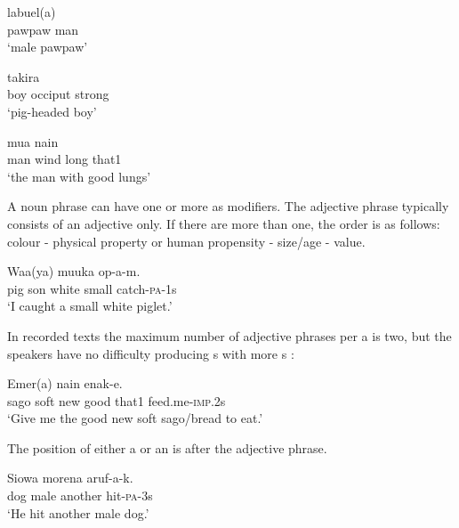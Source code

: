 \ea%
\label{ex:4:x416}
\gll labuel(a)   \\
     pawpaw  man \\
\glt`male pawpaw'
\z

\ea%
\label{ex:4:x417}
\gll takira     \\
  boy  occiput  strong    \\
\glt`pig-headed boy'
\z

\ea%
\label{ex:4:x418}
\gll mua     nain  \\
   man  wind  long  that1   \\
\glt`the man with good lungs'
\z

A noun phrase can have one or more  as modifiers. The adjective phrase typically consists of an adjective only. If there are more  than one, the order is as follows: colour - physical property or human propensity - size/age - value.

\ea%
\label{ex:4:x419}
\gll Waa(ya)  muuka     op-a-m. \\
  pig  son  white  small  catch-\textsc{pa}-1s    \\
\glt`I caught  a small white piglet.'
\z

In recorded texts the maximum number of adjective phrases per a  is two, but the speakers have no difficulty producing s with more s :

\ea%
\label{ex:4:x420}
\gll Emer(a)      nain  enak-e. \\
  sago  soft  new  good  that1  feed.me-\textsc{imp}.2s    \\
\glt`Give me the good new soft sago/bread to eat.'
\z

The position of either a  or an  is after the adjective phrase.

\ea%
\label{ex:4:x804}
\gll Siowa  morena    aruf-a-k. \\
  dog  male  another  hit-\textsc{pa}-3s    \\
\glt`He hit another male dog.'
\z

